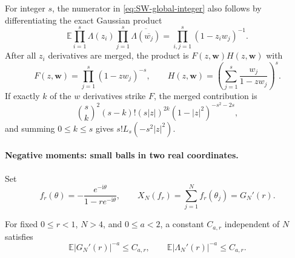 For integer $s$, the numerator in \eqref{eq:SW-global-integer} also follows by differentiating
the exact Gaussian product
\begin{equation}
 \mathbb E\prod_{i=1}^{s}\Lambda(z_i)
              \prod_{j=1}^{s}\overline{\Lambda(\overline{w_j})}
 =\prod_{i,j=1}^{s}(1-z_iw_j)^{-1}.
 \label{eq:SW-Gaussian-product}
\end{equation}
After all $z_i$ derivatives are merged, the product is
$F(z,\mathbf w)H(z,\mathbf w)$ with
\begin{equation}
 F(z,\mathbf w)=\prod_{j=1}^{s}(1-zw_j)^{-s},\qquad
 H(z,\mathbf w)=\left(\sum_{j=1}^{s}\frac{w_j}{1-zw_j}\right)^s.
\end{equation}
If exactly $k$ of the $w$ derivatives strike $F$, the merged contribution is
\begin{equation}
 \binom{s}{k}^2(s-k)!(s|z|)^{2k}(1-|z|^2)^{-s^2-2s},
\end{equation}
and summing $0\leq k\leq s$ gives $s!L_s(-s^2|z|^2)$.

\paragraph{Negative moments: small balls in two real coordinates.}
Set
\begin{equation}
 f_r(\theta)=-\frac{e^{-\mathrm i\theta}}{1-re^{-\mathrm i\theta}},
 \qquad X_N(f_r)=\sum_{j=1}^{N}f_r(\theta_j)=G_N'(r).
\end{equation}

\begin{theorem}
\label{thm:SW-negative}
For fixed $0\leq r<1$, $N>4$, and $0\leq a<2$, a constant $C_{a,r}$ independent of $N$
satisfies
\begin{equation}
 \mathbb E|G_N'(r)|^{-a}\leq C_{a,r},\qquad
 \mathbb E|\Lambda_N'(r)|^{-a}\leq C_{a,r}.
 \label{eq:SW-negative}
\end{equation}
\end{theorem}

